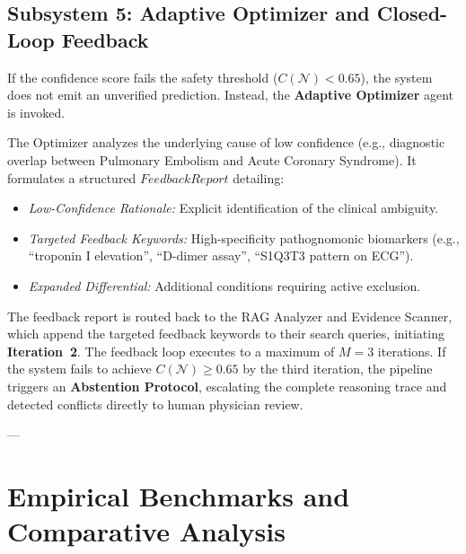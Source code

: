 \documentclass[conference]{IEEEtran}
\begin{document}
\subsection{Subsystem 5: Adaptive Optimizer and Closed-Loop Feedback}
If the confidence score fails the safety threshold ($C(\mathcal{N}) < 0.65$), the system does not emit an unverified prediction. Instead, the \textbf{Adaptive Optimizer} agent is invoked.

The Optimizer analyzes the underlying cause of low confidence (e.g., diagnostic overlap between Pulmonary Embolism and Acute Coronary Syndrome). It formulates a structured $FeedbackReport$ detailing:
\begin{itemize}
    \item \textit{Low-Confidence Rationale:} Explicit identification of the clinical ambiguity.
    \item \textit{Targeted Feedback Keywords:} High-specificity pathognomonic biomarkers (e.g., ``troponin I elevation'', ``D-dimer assay'', ``S1Q3T3 pattern on ECG'').
    \item \textit{Expanded Differential:} Additional conditions requiring active exclusion.
\end{itemize}

The feedback report is routed back to the RAG Analyzer and Evidence Scanner, which append the targeted feedback keywords to their search queries, initiating \textbf{Iteration~2}. The feedback loop executes to a maximum of $M = 3$ iterations. If the system fails to achieve $C(\mathcal{N}) \ge 0.65$ by the third iteration, the pipeline triggers an \textbf{Abstention Protocol}, escalating the complete reasoning trace and detected conflicts directly to human physician review.

---

\section{Empirical Benchmarks and Comparative Analysis}
\end{document}
